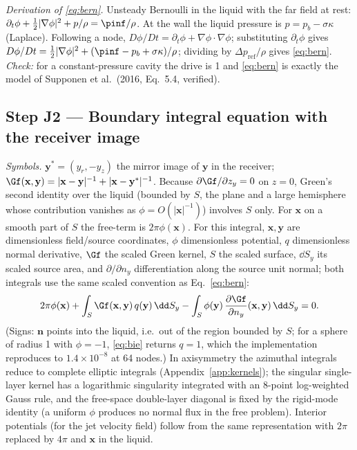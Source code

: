 \emph{Derivation of \eqref{eq:bern}.} Unsteady Bernoulli in the liquid with the far field at rest:
$\partial_t\phi+\tfrac12|\nabla\phi|^2+p/\rho=\pinf/\rho$. At the wall the liquid pressure is
$p=p_b-\sigma\kappa$ (Laplace). Following a node, $D\phi/Dt=\partial_t\phi+\nabla\phi\cdot\nabla\phi$; substituting
$\partial_t\phi$ gives $D\phi/Dt=\tfrac12|\nabla\phi|^2+(\pinf-p_b+\sigma\kappa)/\rho$; dividing by
$\Delta p_{\mathrm{ref}}/\rho$ gives \eqref{eq:bern}. \emph{Check:} for a constant-pressure cavity the drive
is 1 and \eqref{eq:bern} is exactly the model of Supponen et al.\ (2016, Eq.~5.4, verified).

\subsection{Step J2 --- Boundary integral equation with the receiver image}
\emph{Symbols.} $\mathbf y^*=(y_r,-y_z)$ the mirror image of $\mathbf y$ in the receiver;
$\Gf(\mathbf x,\mathbf y)=|\mathbf x-\mathbf y|^{-1}+|\mathbf x-\mathbf y^*|^{-1}$.
Because $\partial\Gf/\partial z_y=0$ on $z=0$, Green's second identity over the liquid (bounded by $S$, the plane and a
large hemisphere whose contribution vanishes as $\phi=O(|\mathbf x|^{-1})$) involves $S$ only. For $\mathbf x$ on a
smooth part of $S$ the free-term is $2\pi\phi(\mathbf x)$.
For this integral, $\mathbf x,\mathbf y$ are dimensionless field/source coordinates,
$\phi$ dimensionless potential, $q$ dimensionless normal derivative, $\Gf$ the scaled Green kernel,
$S$ the scaled surface, $\dd S_y$ its scaled source area, and
$\partial/\partial n_y$ differentiation along the source unit normal; both integrals use the same
scaled convention as Eq.~\eqref{eq:bern}:
\begin{equation}
2\pi\phi(\mathbf x)+\int_S \Gf(\mathbf x,\mathbf y)\,q(\mathbf y)\,\dd S_y-\int_S\phi(\mathbf y)\,\frac{\partial\Gf}{\partial n_y}(\mathbf x,\mathbf y)\,\dd S_y=0 .\label{eq:bie}
\end{equation}
(Signs: $\mathbf n$ points into the liquid, i.e.\ out of the region bounded by $S$; for a sphere of radius 1 with
$\phi=-1$, \eqref{eq:bie} returns $q=1$, which the implementation reproduces to $1.4\times10^{-8}$ at 64 nodes.) In
axisymmetry the azimuthal integrals reduce to complete elliptic integrals (Appendix~\ref{app:kernels}); the
singular single-layer kernel has a logarithmic singularity integrated with an 8-point log-weighted Gauss rule,
and the free-space double-layer diagonal is fixed by the rigid-mode identity (a uniform $\phi$ produces no
normal flux in the free problem). Interior potentials (for the jet velocity field) follow from the same
representation with $2\pi$ replaced by $4\pi$ and $\mathbf x$ in the liquid.

